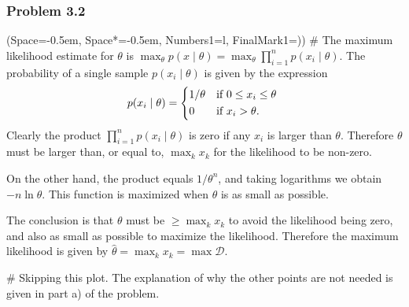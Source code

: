 \documentclass[12pt, a4paper]{article}
\newcommand{\listSpace}{-0.5em}%
\newcommand{\D}{\mathcal{D}}
\begin{document}
\subsubsection*{Problem 3.2}
\begin{easylist}[enumerate]
\ListProperties(Space=\listSpace, Space*=\listSpace, Numbers1=l, FinalMark1={)})
# The maximum likelihood estimate for $\theta$ is $\max_\theta p(x  \mid  \theta) = \max_\theta \prod_{i=1}^{n} p(x_i  \mid  \theta)$.
The probability of a single sample $p(x_i  \mid  \theta)$ is given by the expression
\begin{equation*}
	p(x_i  \mid  \theta) = 
	\begin{dcases*}
	1/\theta & if $0 \leq x_i \leq \theta$ \\
	0 & if $ x_i > \theta$.
	\end{dcases*}
\end{equation*}
Clearly the product $\prod_{i=1}^{n} p(x_i  \mid  \theta)$ is zero if any $x_i$ is larger than $\theta$.
Therefore $\theta$ must be larger than, or equal to, $\max_k x_k$ for the likelihood to be non-zero.

On the other hand, the product equals $1 /\theta^n$, and taking logarithms we obtain $-n \ln \theta$.
This function is maximized when $\theta$ is as small as possible.

The conclusion is that $\theta$ must be $\geq \max_k x_k$ to avoid the likelihood being zero, and also as small as possible to maximize the likelihood.
Therefore the maximum likelihood is given by $\hat{\theta} = \max_k x_k = \max \D$.

# Skipping this plot. The explanation of why the other points are not needed is given in part a) of the problem.
\end{easylist}
\end{document}
